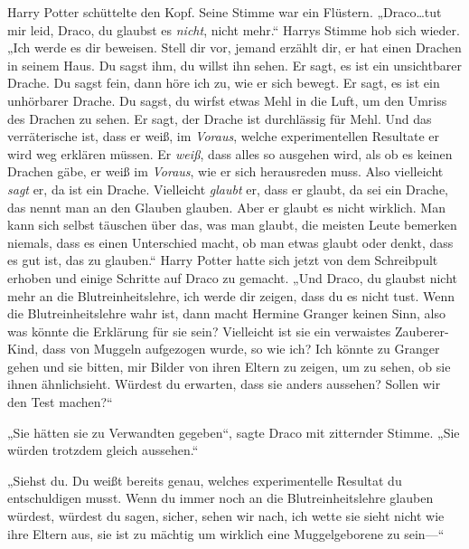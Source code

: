 Harry Potter schüttelte den Kopf. Seine Stimme war ein Flüstern. „Draco…tut mir leid, Draco, du glaubst es \emph{nicht}, nicht mehr.“ Harrys Stimme hob sich wieder. „Ich werde es dir beweisen. Stell dir vor, jemand erzählt dir, er hat einen Drachen in seinem Haus. Du sagst ihm, du willst ihn sehen. Er sagt, es ist ein unsichtbarer Drache. Du sagst fein, dann höre ich zu, wie er sich bewegt. Er sagt, es ist ein unhörbarer Drache. Du sagst, du wirfst etwas Mehl in die Luft, um den Umriss des Drachen zu sehen. Er sagt, der Drache ist durchlässig für Mehl. Und das verräterische ist, dass er weiß, im \emph{Voraus}, welche experimentellen Resultate er wird weg erklären müssen. Er \emph{weiß}, dass alles so ausgehen wird, als ob es keinen Drachen gäbe, er weiß im \emph{Voraus}, wie er sich herausreden muss. Also vielleicht \emph{sagt} er, da ist ein Drache. Vielleicht \emph{glaubt} er, dass er glaubt, da sei ein Drache, das nennt man an den Glauben glauben. Aber er glaubt es nicht wirklich. Man kann sich selbst täuschen über das, was man glaubt, die meisten Leute bemerken niemals, dass es einen Unterschied macht, ob man etwas glaubt oder denkt, dass es gut ist, das zu glauben.“ Harry Potter hatte sich jetzt von dem Schreibpult erhoben und einige Schritte auf Draco zu gemacht. „Und Draco, du glaubst nicht mehr an die Blutreinheitslehre, ich werde dir zeigen, dass du es nicht tust. Wenn die Blutreinheitslehre wahr ist, dann macht Hermine Granger keinen Sinn, also was könnte die Erklärung für sie sein? Vielleicht ist sie ein verwaistes Zauberer-Kind, dass von Muggeln aufgezogen wurde, so wie ich? Ich könnte zu Granger gehen und sie bitten, mir Bilder von ihren Eltern zu zeigen, um zu sehen, ob sie ihnen ähnlichsieht. Würdest du erwarten, dass sie anders aussehen? Sollen wir den Test machen?“

„Sie hätten sie zu Verwandten gegeben“, sagte Draco mit zitternder Stimme. „Sie würden trotzdem gleich aussehen.“

„Siehst du. Du weißt bereits genau, welches experimentelle Resultat du entschuldigen musst. Wenn du immer noch an die Blutreinheitslehre glauben würdest, würdest du sagen, sicher, sehen wir nach, ich wette sie sieht nicht wie ihre Eltern aus, sie ist zu mächtig um wirklich eine Muggelgeborene zu sein—“

